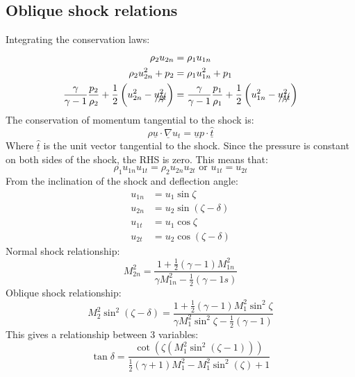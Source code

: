 \documentclass[class=report, crop=false, 12pt,a4paper]{standalone}
\begin{document}
\subsection{Oblique shock relations}
Integrating the conservation laws:
\begin{align}
    \rho_2 u_{2n}                                                                                     & = \rho_1 u_{1n}                                                                                     \\
    \rho_2 u^2_{2n} + p_2                                                                             & = \rho_1 u^2_{1n} + p_1                                                                             \\
    \frac{\gamma}{\gamma - 1}\frac{p_2}{\rho_2} + \frac{1}{2} \left(u^2_{2n} - \xout{u^2_{2t}}\right) & = \frac{\gamma}{\gamma - 1} \frac{p_1}{\rho_1} + \frac{1}{2}\left(u^2_{1n} - \xout{u^2_{1t}}\right)
\end{align}
The conservation of momentum tangential to the shock is:
\begin{equation}
    \rho \underline{u} \cdot \underline{\nabla}u_t = \underline{u}p \cdot\underline{\hat{t}}
\end{equation}
Where $\underline{\hat{t}}$ is the unit vector tangential to the shock. Since the pressure is constant on both sides of the shock, the RHS is zero. This means that:
\begin{equation}
    \rho_1 u_{1n}u_{1t} = \rho_2 u_{2n} u_{2t} \textrm{ or } u_{1t} = u_{2t}
\end{equation}
From the inclination of the shock and deflection angle:
\begin{align}
    u_{1n} & = u_1\sin\zeta                        \\
    u_{2n} & = u_2\sin\left(\zeta - \delta\right)  \\
    u_{1t} & = u_1 \cos \zeta                      \\
    u_{2t} & = u_2 \cos\left(\zeta - \delta\right)
\end{align}
Normal shock relationship:
\begin{equation}
    M^2_{2n} = \dfrac{1 + \frac{1}{2}\left(\gamma - 1\right)M^2_{1n}}{\gamma M^2_{1n} - \frac{1}{2}\left(\gamma -1s\right)}
\end{equation}
Oblique shock relationship:
\begin{equation}
    M^2_2 \sin^2 \left(\zeta - \delta\right) = \dfrac{1 + \frac{1}{2}\left(\gamma - 1\right)M^2_1 \sin^2\zeta}{\gamma M^2_1 \sin^2 \zeta-\frac{1}{2}\left(\gamma - 1\right)}
\end{equation}
This gives a relationship between 3 variables:
\begin{equation}
    \tan \delta = \dfrac{\cot \left(\zeta \left(M^2_1 \sin^2\left(\zeta -1\right)\right)\right)}{\frac{1}{2}\left(\gamma + 1\right)M^2_1 - M^2_1 \sin^2 \left(\zeta\right) + 1}
\end{equation}
\end{document}
